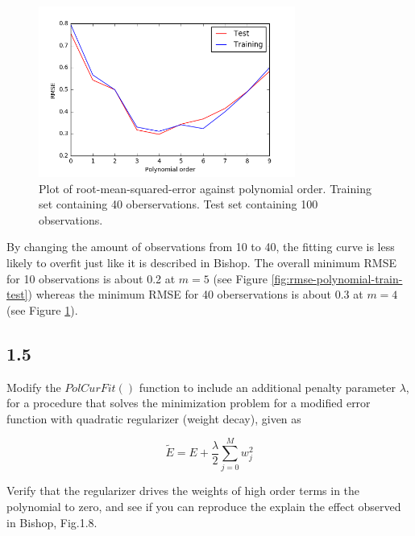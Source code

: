 \documentclass[a4paper]{article}
\begin{document}
\begin{figure}[h!]
\begin{center}
\includegraphics[width=0.75\textwidth]{Images/rmse_polynomial_order_40.png}
\caption{Plot of root-mean-squared-error against polynomial order. Training set containing 40 oberservations. Test set containing 100 observations.}
\label{fig:rmse-polynomial-train-test-40}
\end{center}
\end{figure}

By changing the amount of observations from 10 to 40, the fitting curve is less likely to overfit just like it is described in Bishop. The overall minimum RMSE for 10 observations is about 0.2 at $m = 5$ (see Figure \ref{fig:rmse-polynomial-train-test}) whereas the minimum RMSE for 40 oberservations is about 0.3 at $m = 4$(see Figure \ref{fig:rmse-polynomial-train-test-40}).

\newpage

\subsection*{1.5}

Modify the $PolCurFit()$ function to include an additional penalty parameter $\lambda$, for a procedure that solves the minimization problem for a modified error function with quadratic regularizer (weight decay), given as 

\begin{equation}
	\widetilde{E} = E + \frac{\lambda}{2} \sum_{j = 0}^M w_j^2
\end{equation}

Verify that the regularizer drives the weights of high order terms in the polynomial to zero, and see if you can reproduce the explain the effect observed in Bishop, Fig.1.8.\\
\end{document}
